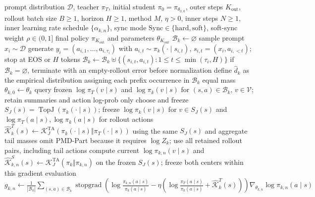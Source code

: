 \begin{algorithm}[ht]
\caption{Tail-aware OPD outer--inner optimization\\{\small\textit{Semantics: 根据正文重构；冻结 outer rollout，以 Tail-aware KL 中心运行 Mean、BPO 或 MDPO，再同步并重新 rollout}}}
\begin{algorithmic}[1]
\Require prompt distribution $\mathcal D$, teacher $\pi_T$, initial student $\pi_0=\pi_{\theta_{0,0}}$, outer steps $K_{\mathrm{out}}$, rollout batch size $B\ge1$, horizon $H\ge1$, method $M$, $\eta>0$, inner steps $N\ge1$, inner learning rate schedule $\{\alpha_{k,n}\}$, sync mode $\mathrm{Sync}\in\{\mathrm{hard},\mathrm{soft}\}$, soft-sync weight $\rho\in(0,1]$
\Ensure final policy $\pi_{K_{\mathrm{out}}}$ and parameters $\theta_{K_{\mathrm{out}}}$
    \State $\mathcal B_k\gets\varnothing$ 
        \State sample prompt $x_i\sim\mathcal D$
        \State generate $y_i=(a_{i,1},\ldots,a_{i,\tau_i})$ with $a_{i,t}\sim\pi_k(\cdot\mid s_{i,t})$, $s_{i,t}=(x_i,a_{i,<t})$; stop at EOS or $H$ tokens
        \State $\mathcal B_k\gets\mathcal B_k\mathbin{\uplus}\{(s_{i,t},a_{i,t}):1\le t\le\min(\tau_i,H)\}$
    \EndFor
    \State if $\mathcal B_k=\varnothing$, terminate with an empty-rollout error before normalization
    \State define $\widehat d_k$ as the empirical distribution assigning each prefix occurrence in $\mathcal B_k$ equal mass
    \State $\theta_{k,0}\gets\theta_k$ 
    \State query frozen $\log\pi_T(v\mid s)$ and $\log\pi_k(v\mid s)$ for $(s,a)\in\mathcal B_k$, $v\in\mathcal V$; retain summaries and action log-prob only
    \State choose and freeze $S_J(s)=\operatorname{TopJ}(\pi_k(\cdot\mid s))$; freeze $\log\pi_k(v\mid s)$ for $v\in S_J(s)$ and $\log\pi_T(a\mid s),\log\pi_k(a\mid s)$ for rollout actions
    \State $\widehat{\mathcal K}_k^{T}(s)\gets\mathcal K_J^{\mathrm{TA}}(\pi_k(\cdot\mid s)\Vert\pi_T(\cdot\mid s))$ using the same $S_J(s)$ and aggregate tail masses
    \State omit PMD-Part because it requires $\log Z_k$; use all retained rollout pairs, including tail actions
        \State compute current $\log\pi_{k,n}(v\mid s)$ and $\widehat{\mathcal K}_{k,n}^{S}(s)\gets\mathcal K_J^{\mathrm{TA}}(\pi_k\Vert\pi_{k,n})$ on the frozen $S_J(s)$; freeze both centers within this gradient evaluation
            \State $g_{k,n}\gets\frac1{|\mathcal B_k|}\sum_{(s,a)\in\mathcal B_k}\operatorname{stopgrad}\!\left(\log\frac{\pi_{k,n}(a\mid s)}{\pi_k(a\mid s)}-\eta\left(\log\frac{\pi_T(a\mid s)}{\pi_k(a\mid s)}+\widehat{\mathcal K}_k^{T}(s)\right)\right)\nabla_{\theta_{k,n}}\log\pi_{k,n}(a\mid s)$

\end{algorithmic}
\end{algorithm}
